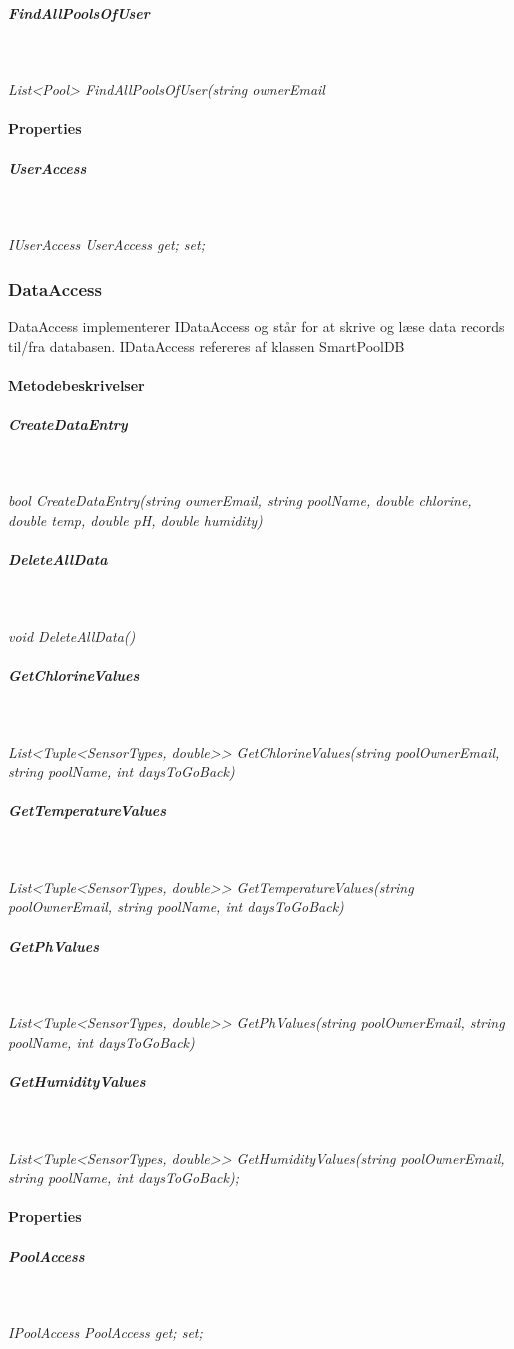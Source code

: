 \subparagraph{FindAllPoolsOfUser}\

\textit{List<Pool> FindAllPoolsOfUser(string ownerEmail}

\paragraph{Properties}

\subparagraph{UserAccess}\

\textit{IUserAccess UserAccess { get; set; }}


\subsubsection{DataAccess}
DataAccess implementerer IDataAccess og står for at skrive og læse data records til/fra databasen.
IDataAccess refereres af klassen SmartPoolDB



\paragraph{Metodebeskrivelser}

\subparagraph{CreateDataEntry}\

\textit{bool CreateDataEntry(string ownerEmail, string poolName, double chlorine, double temp, double pH, double humidity)}


\subparagraph{DeleteAllData}\

\textit{void DeleteAllData()}

\subparagraph{GetChlorineValues}\

\textit{List<Tuple<SensorTypes, double>> GetChlorineValues(string poolOwnerEmail, string poolName, int daysToGoBack)}

\subparagraph{GetTemperatureValues}\

\textit{List<Tuple<SensorTypes, double>> GetTemperatureValues(string poolOwnerEmail, string poolName, int daysToGoBack)}

\subparagraph{GetPhValues}\

\textit{List<Tuple<SensorTypes, double>> GetPhValues(string poolOwnerEmail, string poolName, int daysToGoBack)}

\subparagraph{GetHumidityValues}\

\textit{List<Tuple<SensorTypes, double>> GetHumidityValues(string poolOwnerEmail, string poolName, int daysToGoBack);}

\paragraph{Properties}

\subparagraph{PoolAccess}\

\textit{IPoolAccess PoolAccess { get; set; }}

